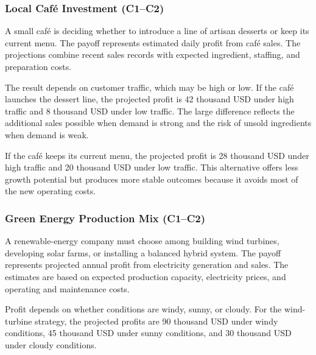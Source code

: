 
	\subsubsection{Local Café Investment (C1--C2)}
	\label{sec:problem3-local-cafe-investment-c1-c2}
	
	A small café is deciding whether to introduce a line of artisan desserts or keep its current menu. The payoff represents estimated daily profit from café sales. The projections combine recent sales records with expected ingredient, staffing, and preparation costs.
	
	The result depends on customer traffic, which may be high or low. If the café launches the dessert line, the projected profit is 42 thousand USD under high traffic and 8 thousand USD under low traffic. The large difference reflects the additional sales possible when demand is strong and the risk of unsold ingredients when demand is weak.
	
	If the café keeps its current menu, the projected profit is 28 thousand USD under high traffic and 20 thousand USD under low traffic. This alternative offers less growth potential but produces more stable outcomes because it avoids most of the new operating costs.
	
	\subsubsection{Green Energy Production Mix (C1--C2)}
	\label{sec:problem4-green-energy-production-mix-c1-c2}
	
	A renewable-energy company must choose among building wind turbines, developing solar farms, or installing a balanced hybrid system. The payoff represents projected annual profit from electricity generation and sales. The estimates are based on expected production capacity, electricity prices, and operating and maintenance costs.
	
	Profit depends on whether conditions are windy, sunny, or cloudy. For the wind-turbine strategy, the projected profits are 90 thousand USD under windy conditions, 45 thousand USD under sunny conditions, and 30 thousand USD under cloudy conditions.
	

